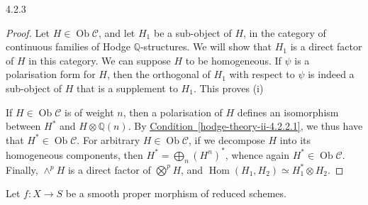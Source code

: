 \begin{lemma}{4.2.3}
\begin{enumerate}
    \end{enumerate}\begin{proof}\par{}Let \(H\in \operatorname {Ob}\mathcal {C}\), and let \(H_1\) be a sub-object of \(H\), in the category of continuous families of Hodge \(\mathbb {Q}\)-structures.
      We will show that \(H_1\) is a direct factor of \(H\) in this category.
      We can suppose \(H\) to be homogeneous.
      If \(\psi \) is a polarisation form for \(H\), then the orthogonal of \(H_1\) with respect to \(\psi \) is indeed a sub-object of \(H\) that is a supplement to \(H_1\).
      This proves (i)\par{}If \(H\in \operatorname {Ob}\mathcal {C}\) is of weight \(n\), then a polarisation of \(H\) defines an isomorphism between \(H^*\) and \(H\otimes \mathbb {Q}(n)\).
      By \hyperref[hodge-theory-ii-4.2.2.1]{Condition~\ref*{hodge-theory-ii-4.2.2.1}}, we thus have that \(H^*\in \operatorname {Ob}\mathcal {C}\).
      For arbitrary \(H\in \operatorname {Ob}\mathcal {C}\), if we decompose \(H\) into its homogeneous components, then \(H^*=\bigoplus _n(H^n)^*\), whence again \(H^*\in \operatorname {Ob}\mathcal {C}\).
      Finally, \(\wedge ^p H\) is a direct factor of \(\bigotimes ^p H\), and \(\operatorname {Hom}(H_1,H_2)\simeq  H_1^*\otimes  H_2\).\end{proof}\end{lemma}\par{}Let \(f\colon  X\to  S\) be a smooth proper morphism of reduced schemes.
